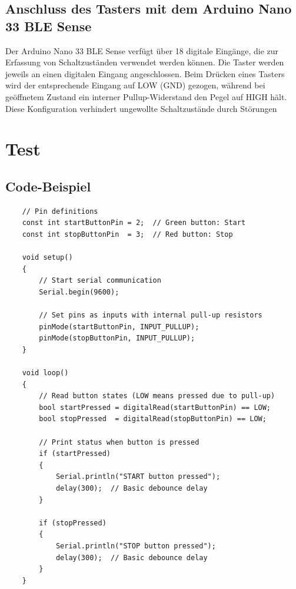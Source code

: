 \subsection{Anschluss des Tasters mit dem Arduino Nano 33 BLE Sense}

Der Arduino Nano 33 BLE Sense verfügt über 18 digitale Eingänge, die zur Erfassung von Schaltzuständen verwendet werden können. Die Taster werden jeweils an einen digitalen Eingang angeschlossen. Beim Drücken eines Tasters wird der entsprechende Eingang auf LOW (GND) gezogen, während bei geöffnetem Zustand ein interner Pullup-Widerstand den Pegel auf HIGH hält. Diese Konfiguration verhindert ungewollte Schaltzustände durch Störungen


\section{Test}

\subsection{Code-Beispiel}


\begin{lstlisting}
	// Pin definitions
	const int startButtonPin = 2;  // Green button: Start
	const int stopButtonPin  = 3;  // Red button: Stop
	
	void setup() 
	{
		// Start serial communication
		Serial.begin(9600);
		
		// Set pins as inputs with internal pull-up resistors
		pinMode(startButtonPin, INPUT_PULLUP);
		pinMode(stopButtonPin, INPUT_PULLUP);
	}
	
	void loop() 
	{
		// Read button states (LOW means pressed due to pull-up)
		bool startPressed = digitalRead(startButtonPin) == LOW;
		bool stopPressed  = digitalRead(stopButtonPin) == LOW;
		
		// Print status when button is pressed
		if (startPressed) 
		{
			Serial.println("START button pressed");
			delay(300);  // Basic debounce delay
		}
		
		if (stopPressed) 
		{
			Serial.println("STOP button pressed");
			delay(300);  // Basic debounce delay
		}
	}
	
\end{lstlisting}



